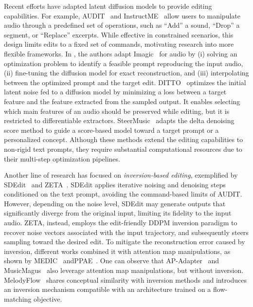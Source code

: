 Recent efforts have adapted latent diffusion models to provide editing capabilities. 
For example, {AUDIT}~\cite{wang2023audit} and InstructME~\cite{han2023instructmeinstructionguidedmusic} allow users to manipulate audio through a predefined set of operations, such as ``Add'' a sound, ``Drop'' a segment, or ``Replace'' excerpts. 
While effective in constrained scenarios, this design limits edits to a fixed set of commands, motivating research into more flexible frameworks. 
In \cite{paissan2024b_inspeech}, the authors adapt Imagic~\cite{kawar2023imagic} for audio by (i) solving an optimization problem to identify a feasible prompt reproducing the input audio, (ii) fine-tuning the diffusion model for exact reconstruction, and (iii) interpolating between the optimized prompt and the target edit. 
DITTO~\cite{novack2024ditto2distilleddiffusioninferencetime} optimizes the initial latent noise fed to a diffusion model by minimizing a loss between a target feature and the feature extracted from the sampled output. It enables selecting which main features of an audio should be preserved while editing, but it is restricted to differentiable extractors. 
SteerMusic~\cite{niu2025steermusic} adapts the delta denoising score method to guide a score-based model toward a target prompt or a personalized concept.
Although these methods extend the editing capabilities to non-rigid text prompts, they require substantial computational resources due to their multi-step optimization pipelines.

Another line of research has focused on \textit{inversion-based editing}, exemplified by SDEdit~\cite{Meng2021SDEditGI} and ZETA~\cite{Manor2024ZeroShotUA}. 
SDEdit applies iterative noising and denoising steps conditioned on the text prompt, avoiding the command-based limits of AUDIT. 
However, depending on the noise level, SDEdit may generate outputs that significantly diverge from the original input, limiting its fidelity to the input audio. 
ZETA, instead, employs the edit-friendly DDPM inversion paradigm to recover noise vectors associated with the input trajectory, and subsequently steers sampling toward the desired edit. 
To mitigate the reconstruction error caused by inversion, different works combined it with attention map manipulations, as shown by MEDIC~\cite{liu2024mediczeroshotmusicediting} andPPAE~\cite{xu2024promptguidedpreciseaudioediting}. One can observe that AP-Adapter~\cite{tsai2024audiopromptadapterunleashing} and MusicMagus~\cite{zhang2024musicmaguszeroshottexttomusicediting} also leverage attention map manipulations, but without inversion.
MelodyFlow~\cite{lan2024highfidelitytextguidedmusic} shares conceptual similarity with inversion methods and introduces an inversion mechanism compatible with an architecture trained on a flow-matching objective.

